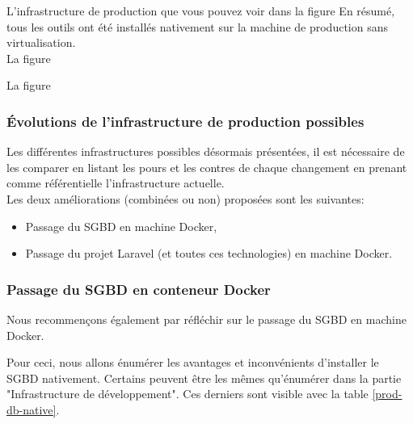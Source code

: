 \documentclass[
    iai, %
    il, %
]{heig-tb}
\begin{document}
L'infrastructure de production que vous pouvez voir dans la figure %
En résumé, tous les outils ont été installés nativement sur la machine de production sans virtualisation.\\

La figure %

La figure %

\subsubsection{Évolutions de l'infrastructure de production possibles}
Les différentes infrastructures possibles désormais présentées, il est nécessaire de les comparer en listant les pours et les contres de chaque changement en prenant comme référentielle l'infrastructure actuelle.\\
Les deux améliorations (combinées ou non) proposées sont les suivantes:
\begin{itemize}
    \item Passage du SGBD en machine Docker,
    \item Passage du projet Laravel (et toutes ces technologies) en machine Docker.
\end{itemize}

\subsubsection{Passage du SGBD en conteneur Docker}
Nous recommençons également par réfléchir sur le passage du SGBD en machine Docker.

Pour ceci, nous allons énumérer les avantages et inconvénients d'installer le SGBD nativement.
Certains peuvent être les mêmes qu'énumérer dans la partie "Infrastructure de
développement". Ces derniers sont visible avec la table \ref{prod-db-native}.
\end{document}
